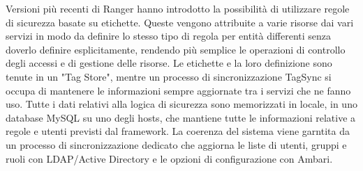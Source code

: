 Versioni più recenti di Ranger hanno introdotto la possibilità di utilizzare regole di sicurezza basate su etichette. Queste vengono attribuite a varie risorse dai vari servizi in modo da definire lo stesso tipo di regola per entità differenti senza doverlo definire esplicitamente, rendendo più semplice le operazioni di controllo degli accessi e di gestione delle risorse. Le etichette e la loro definizione sono tenute in un "Tag Store", mentre un processo di sincronizzazione TagSync si occupa di mantenere le informazioni sempre aggiornate tra i servizi che ne fanno uso.
\newline
Tutte i dati relativi alla logica di sicurezza sono memorizzati in locale, in uno database MySQL su uno degli hosts, che mantiene tutte le informazioni relative a regole e utenti previsti dal framework. La coerenza del sistema viene garntita da un processo di sincronizzazione dedicato che aggiorna le liste di utenti, gruppi e ruoli con LDAP/Active Directory e le opzioni di configurazione con Ambari.